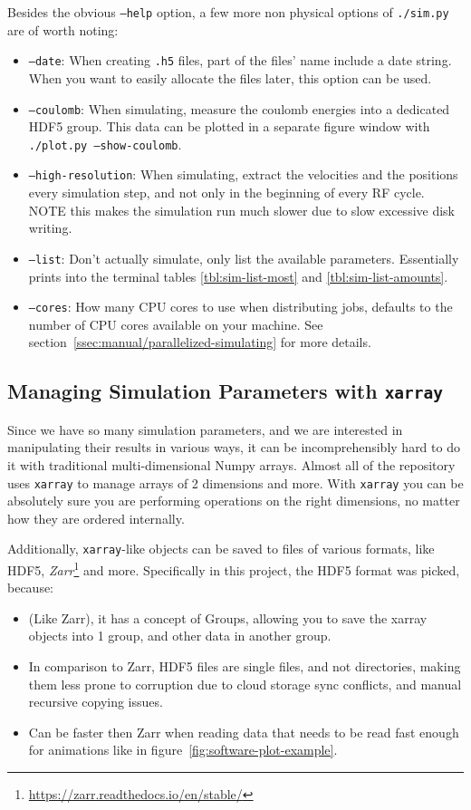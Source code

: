 Besides the obvious \texttt{--help} option, a few more non physical options of \texttt{./sim.py} are of worth noting:

\begin{itemize}
	\item \texttt{--date}: When creating \texttt{.h5} files, part of the files' name include a date string. When you want to easily allocate the files later, this option can be used.
	\item \texttt{--coulomb}: When simulating, measure the coulomb energies into a dedicated HDF5 group. This data can be plotted in a separate figure window with \texttt{./plot.py --show-coulomb}.
	\item \texttt{--high-resolution}: When simulating, extract the velocities and the positions every simulation step, and not only in the beginning of every RF cycle. NOTE this makes the simulation run much slower due to slow excessive disk writing.
	\item \texttt{--list}: Don't actually simulate, only list the available parameters. Essentially prints into the terminal tables \ref{tbl:sim-list-most} and \ref{tbl:sim-list-amounts}.
	\item \texttt{--cores}: How many CPU cores to use when distributing jobs, defaults to the number of CPU cores available on your machine. See section~\ref{ssec:manual/parallelized-simulating} for more details.
\end{itemize}

\subsection{Managing Simulation Parameters with \texttt{xarray}}

Since we have so many simulation parameters, and we are interested in manipulating their results in various ways, it can be incomprehensibly hard to do it with traditional multi-dimensional Numpy arrays. Almost all of the repository uses \texttt{xarray}\cite{xarray} to manage arrays of 2 dimensions and more. With \texttt{xarray} you can be absolutely sure you are performing operations on the right dimensions, no matter how they are ordered internally.

Additionally, \texttt{xarray}-like objects can be saved to files of various formats, like HDF5\cite{HDF5}, \textit{Zarr}\footnote{\url{https://zarr.readthedocs.io/en/stable/}} and more. Specifically in this project, the HDF5 format was picked, because:

\begin{itemize}
	\item (Like Zarr), it has a concept of Groups, allowing you to save the xarray objects into 1 group, and other data in another group.
	\item In comparison to Zarr, HDF5 files are single files, and not directories, making them less prone to corruption due to cloud storage sync conflicts, and manual recursive copying issues.
	\item Can be faster then Zarr when reading data that needs to be read fast enough for animations like in figure~\ref{fig:software-plot-example}.
\end{itemize}


